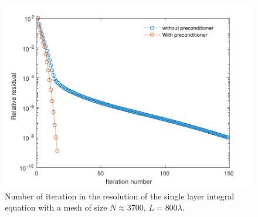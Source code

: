 \documentclass[a4paper]{subfiles}
\begin{document}
\begin{figure}[H]
	\centering
	\includegraphics[scale=0.5]{OpenArc/figs/PrecondDirichletHelmSegPDF}
	\caption{Number of iteration in the resolution of the single layer integral equation with a mesh of size $N \approx 3700$, $L = 800 \lambda$.}
	\label{FigureNitHelmDirichlet}
\end{figure}
\end{document}
